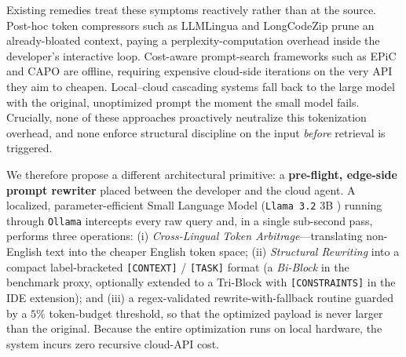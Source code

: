 \documentclass[11pt,a4paper,twocolumn]{article}
\begin{document}
Existing remedies treat these symptoms reactively rather than at the source. Post-hoc token compressors such as LLMLingua \cite{jiang-etal-2023-llmlingua} and LongCodeZip \cite{shi2025longcodezip} prune an already-bloated context, paying a perplexity-computation overhead inside the developer's interactive loop. Cost-aware prompt-search frameworks such as EPiC \cite{taherkhani2025epic} and CAPO \cite{zehle2025capo} are offline, requiring expensive cloud-side iterations on the very API they aim to cheapen. Local--cloud cascading systems \cite{lu2026mccom, chen2024modelcascading} fall back to the large model with the original, unoptimized prompt the moment the small model fails. Crucially, none of these approaches proactively neutralize this tokenization overhead, and none enforce structural discipline on the input \textit{before} retrieval is triggered.

We therefore propose a different architectural primitive: a \textbf{pre-flight, edge-side prompt rewriter} placed between the developer and the cloud agent. A localized, parameter-efficient Small Language Model (\texttt{Llama 3.2} 3B \cite{meta2024llama32}) running through \texttt{Ollama} intercepts every raw query and, in a single sub-second pass, performs three operations: (i) \textit{Cross-Lingual Token Arbitrage}---translating non-English text into the cheaper English token space; (ii) \textit{Structural Rewriting} into a compact label-bracketed \texttt{[CONTEXT]} / \texttt{[TASK]} format (a \textit{Bi-Block} in the benchmark proxy, optionally extended to a Tri-Block with \texttt{[CONSTRAINTS]} in the IDE extension); and (iii) a regex-validated rewrite-with-fallback routine guarded by a $5\%$ token-budget threshold, so that the optimized payload is never larger than the original. Because the entire optimization runs on local hardware, the system incurs zero recursive cloud-API cost.
\end{document}
